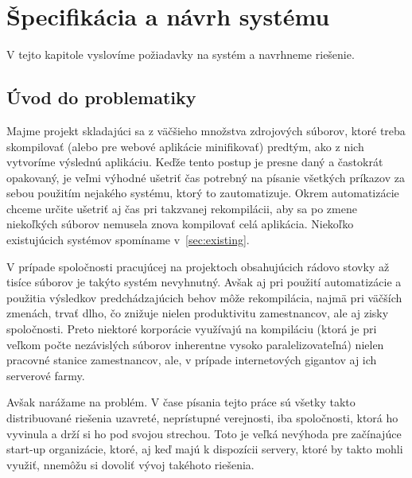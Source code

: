 \chapter{\v{S}pecifik\'{a}cia a n\'{a}vrh syst\'{e}mu}
\label{ch:spec}

V tejto kapitole vyslovíme požiadavky na systém a navrhneme riešenie.

\section{\'{U}vod do problematiky}

Majme projekt skladajúci sa z väčšieho množstva zdrojových súborov, ktoré treba
skompilovať (alebo pre webové aplikácie minifikovať) predtým, ako z nich vytvoríme
výslednú aplikáciu. Keďže tento postup je presne daný a častokrát opakovaný,
je veľmi výhodné ušetriť čas potrebný na písanie všetkých príkazov za sebou
použitím nejakého systému, ktorý to zautomatizuje. Okrem automatizácie chceme
určite ušetriť aj čas pri takzvanej rekompilácii, aby sa po zmene niekoľkých súborov
nemusela znova kompilovať celá aplikácia. Niekoľko existujúcich systémov spomíname
v~\ref{sec:existing}.

V prípade spoločnosti pracujúcej na projektoch obsahujúcich rádovo stovky až tisíce
súborov je takýto systém nevyhnutný. Avšak aj pri použití automatizácie a použitia
výsledkov predchádzajúcich behov môže rekompilácia, najmä pri väčších zmenách,
trvať dlho, čo znižuje nielen produktivitu zamestnancov, ale aj zisky spoločnosti.
Preto niektoré korporácie využívajú na kompiláciu (ktorá je pri veľkom počte
nezávislých súborov inherentne vysoko paralelizovateľná) nielen pracovné stanice
zamestnancov, ale, v prípade internetových gigantov aj ich serverové farmy.

Avšak narážame na problém. V čase písania tejto práce sú všetky takto distribuované
riešenia uzavreté, neprístupné verejnosti, iba spoločnosti, ktorá ho vyvinula
a drží si ho pod svojou strechou. Toto je veľká nevýhoda pre začínajúce start-up
organizácie, ktoré, aj keď majú k dispozícii servery, ktoré by takto mohli využiť,
nnemôžu si dovoliť vývoj takéhoto riešenia.
